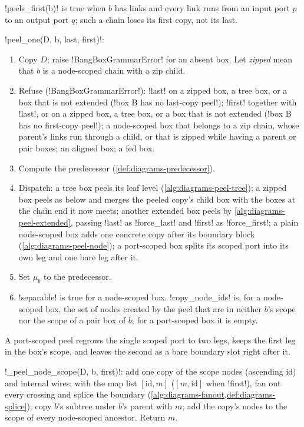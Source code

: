 \py!peels_first(b)! is true when $b$ has links and every link runs from an input port $p$ to an output port $q$; such a chain loses its first copy, not its last.

\begin{algorithm}\label{alg:diagrams-peel-one}
\py!peel_one(D, b, last, first)!:
\begin{enumerate}
\item Copy $D$; raise \py!BangBoxGrammarError! for an absent box. Let \emph{zipped} mean that $b$ is a node-scoped chain with a zip child.
\item Refuse (\py!BangBoxGrammarError!): \py!last! on a zipped box, a tree box, or a box that is not extended (\code!box B has no last-copy peel!); \py!first! together with \py!last!, or on a zipped box, a tree box, or a box that is not extended (\code!box B has no first-copy peel!); a node-scoped box that belongs to a zip chain, whose parent's links run through a child, or that is zipped while having a parent or pair boxes; an aligned box; a fed box.
\item Compute the predecessor (\cref{def:diagrams-predecessor}).
\item Dispatch: a tree box peels its leaf level (\cref{alg:diagrams-peel-tree}); a zipped box peels as below and merges the peeled copy's child box with the boxes at the chain end it now meets; another extended box peels by \cref{alg:diagrams-peel-extended}, passing \py!last! as \py!force_last! and \py!first! as \py!force_first!; a plain node-scoped box adds one concrete copy after its boundary block (\cref{alg:diagrams-peel-node}); a port-scoped box splits its scoped port into its own leg and one bare leg after it.
\item Set $\mu_b$ to the predecessor.
\item \py!separable! is true for a node-scoped box. \py!copy_node_ids! is, for a node-scoped box, the set of nodes created by the peel that are in neither $b$'s scope nor the scope of a pair box of $b$; for a port-scoped box it is empty.
\end{enumerate}
\end{algorithm}

A port-scoped peel regrows the single scoped port to two legs, keeps the first leg in the box's scope, and leaves the second as a bare boundary slot right after it.

\begin{algorithm}\label{alg:diagrams-peel-node}
\py!_peel_node_scope(D, b, first)!: add one copy of the scope nodes (ascending id) and internal wires; with the map list $[\mathrm{id}, m]$ ($[m,\mathrm{id}]$ when \py!first!), fan out every crossing and splice the boundary (\cref{alg:diagrams-fanout,def:diagrams-splice}); copy $b$'s subtree under $b$'s parent with $m$; add the copy's nodes to the scope of every node-scoped ancestor. Return $m$.
\end{algorithm}

